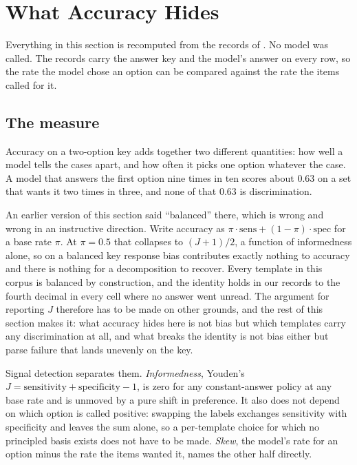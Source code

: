 \section{What Accuracy Hides}
\label{sec:signal}

Everything in this section is recomputed from the records of
. No model was called. The records carry the answer key and
the model's answer on every row, so the rate the model chose an option can be
compared against the rate the items called for it.

\subsection{The measure}

Accuracy on a two-option key adds together two different quantities: how well a
model tells the cases apart, and how often it picks one option whatever the
case. A model that answers the first option nine times in ten scores about 0.63
on a set that wants it two times in three, and none of that 0.63 is
discrimination.

An earlier version of this section said ``balanced'' there, which is wrong and
wrong in an instructive direction. Write accuracy as
$\pi \cdot \mathrm{sens} + (1 - \pi) \cdot \mathrm{spec}$ for a base rate $\pi$.
At $\pi = 0.5$ that collapses to $(J + 1)/2$, a function of informedness alone,
so on a balanced key response bias contributes exactly nothing to accuracy and
there is nothing for a decomposition to recover. Every template in this corpus
is balanced by construction, and the identity holds in our records to the fourth
decimal in every cell where no answer went unread. The argument for reporting
$J$ therefore has to be made on other grounds, and the rest of this section
makes it: what accuracy hides here is not bias but which templates carry any
discrimination at all, and what breaks the identity is not bias either but parse
failure that lands unevenly on the key.

Signal detection separates them. \emph{Informedness}, Youden's
$J = \mathrm{sensitivity} + \mathrm{specificity} - 1$, is zero for any
constant-answer policy at any base rate and is unmoved by a pure shift in
preference. It also does not depend on which option is called positive:
swapping the labels exchanges sensitivity with specificity and leaves the sum
alone, so a per-template choice for which no principled basis exists does not
have to be made. \emph{Skew}, the model's rate for an option minus the rate the items
wanted it, names the other half directly.

